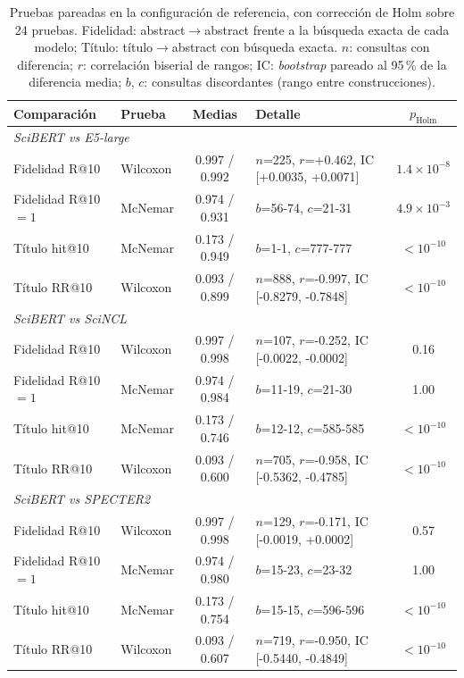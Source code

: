 \begin{table}[tbp]
\caption{Pruebas pareadas en la configuración de referencia, con corrección de Holm sobre 24 pruebas. Fidelidad: abstract$\rightarrow$abstract frente a la búsqueda exacta de cada modelo; Título: título$\rightarrow$abstract con búsqueda exacta. $n$: consultas con diferencia; $r$: correlación biserial de rangos; IC: \textit{bootstrap} pareado al 95\,\% de la diferencia media; $b$, $c$: consultas discordantes (rango entre construcciones).}\label{tab:significancia}
\centering
\scriptsize
\begin{tabular}{|l|l|c|l|c|}
\hline
\textbf{Comparación} & \textbf{Prueba} & \textbf{Medias} & \textbf{Detalle} & \textbf{$p_{\mathrm{Holm}}$} \\
\hline
\multicolumn{5}{|l|}{\textit{SciBERT vs E5-large}} \\
Fidelidad R@10 & Wilcoxon & 0.997 / 0.992 & $n$=225, $r$=+0.462, IC [+0.0035, +0.0071] & $1.4\times10^{-8}$ \\
Fidelidad R@10$=1$ & McNemar & 0.974 / 0.931 & $b$=56-74, $c$=21-31 & $4.9\times10^{-3}$ \\
Título hit@10 & McNemar & 0.173 / 0.949 & $b$=1-1, $c$=777-777 & $<10^{-10}$ \\
Título RR@10 & Wilcoxon & 0.093 / 0.899 & $n$=888, $r$=-0.997, IC [-0.8279, -0.7848] & $<10^{-10}$ \\
\multicolumn{5}{|l|}{\textit{SciBERT vs SciNCL}} \\
Fidelidad R@10 & Wilcoxon & 0.997 / 0.998 & $n$=107, $r$=-0.252, IC [-0.0022, -0.0002] & 0.16 \\
Fidelidad R@10$=1$ & McNemar & 0.974 / 0.984 & $b$=11-19, $c$=21-30 & 1.00 \\
Título hit@10 & McNemar & 0.173 / 0.746 & $b$=12-12, $c$=585-585 & $<10^{-10}$ \\
Título RR@10 & Wilcoxon & 0.093 / 0.600 & $n$=705, $r$=-0.958, IC [-0.5362, -0.4785] & $<10^{-10}$ \\
\multicolumn{5}{|l|}{\textit{SciBERT vs SPECTER2}} \\
Fidelidad R@10 & Wilcoxon & 0.997 / 0.998 & $n$=129, $r$=-0.171, IC [-0.0019, +0.0002] & 0.57 \\
Fidelidad R@10$=1$ & McNemar & 0.974 / 0.980 & $b$=15-23, $c$=23-32 & 1.00 \\
Título hit@10 & McNemar & 0.173 / 0.754 & $b$=15-15, $c$=596-596 & $<10^{-10}$ \\
Título RR@10 & Wilcoxon & 0.093 / 0.607 & $n$=719, $r$=-0.950, IC [-0.5440, -0.4849] & $<10^{-10}$ \\

\end{tabular}
\end{table}
